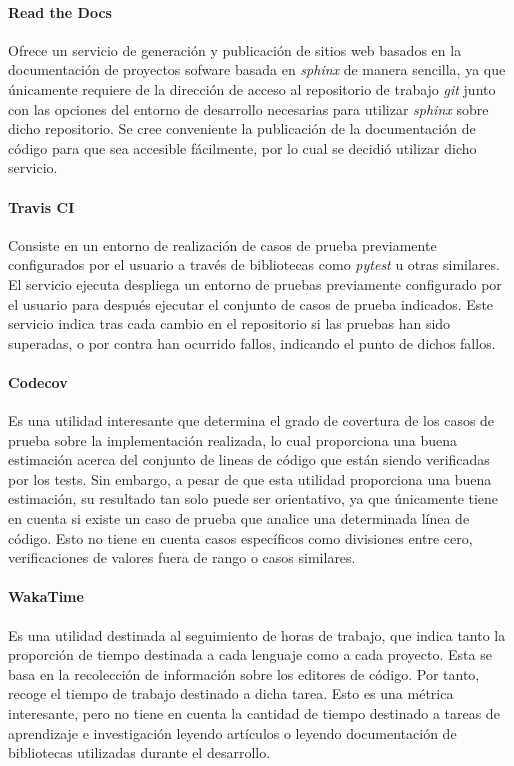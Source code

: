 \documentclass{subfiles}
\begin{document}
        \paragraph{Read the Docs}
        Ofrece un servicio de generación y publicación de sitios web basados en la documentación de proyectos sofware basada en \emph{sphinx} de manera sencilla, ya que únicamente requiere de la dirección de acceso al repositorio de trabajo \emph{git} junto con las opciones del entorno de desarrollo necesarias para utilizar \emph{sphinx} sobre dicho repositorio. Se cree conveniente la publicación de la documentación de código para que sea accesible fácilmente, por lo cual se decidió utilizar dicho servicio.

        \paragraph{Travis CI}
        Consiste en un entorno de realización de casos de prueba previamente configurados por el usuario a través de bibliotecas como \emph{pytest} u otras similares. El servicio ejecuta despliega un entorno de pruebas previamente configurado por el usuario para después ejecutar el conjunto de casos de prueba indicados. Este servicio indica tras cada cambio en el repositorio si las pruebas han sido superadas, o por contra han ocurrido fallos, indicando el punto de dichos fallos.

        \paragraph{Codecov}
        Es una utilidad interesante que determina el grado de covertura de los casos de prueba sobre la implementación realizada, lo cual proporciona una buena estimación acerca del conjunto de lineas de código que están siendo verificadas por los tests. Sin embargo, a pesar de que esta utilidad proporciona una buena estimación, su resultado tan solo puede ser orientativo, ya que únicamente tiene en cuenta si existe un caso de prueba que analice una determinada línea de código. Esto no tiene en cuenta casos específicos como divisiones entre cero, verificaciones de valores fuera de rango o casos similares.

        \paragraph{WakaTime}
        Es una utilidad destinada al seguimiento de horas de trabajo, que indica tanto la proporción de tiempo destinada a cada lenguaje como a cada proyecto. Esta se basa en la recolección de información sobre los editores de código. Por tanto, recoge el tiempo de trabajo destinado a dicha tarea. Esto es una métrica interesante, pero no tiene en cuenta la cantidad de tiempo destinado a tareas de aprendizaje e investigación leyendo artículos o leyendo documentación de bibliotecas utilizadas durante el desarrollo.
\end{document}
